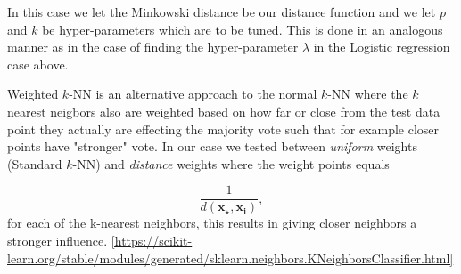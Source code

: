 \documentclass[../../project.tex]{subfiles}
\begin{document}
	In this case we let the Minkowski distance be our distance function and we let $p$ and $k$ be hyper-parameters which are to be tuned. This is done in an analogous manner as in the case of finding the hyper-parameter $\lambda$ in the Logistic regression case above. 
	
	Weighted $k$-NN is an alternative approach to the normal $k$-NN where the $k$ nearest neigbors also are weighted based on how far or close from the test data point they actually are effecting the majority vote such that for example closer points have "stronger" vote. In our case we tested between \textit{uniform} weights (Standard $k$-NN) and \textit{distance} weights where the weight points equals
	
	\begin{equation}
	\dfrac{1}{d(\boldsymbol{x_{\star}, \boldsymbol{x_i}})}, 
	\end{equation}
	for each of the k-nearest neighbors, this results in giving closer neighbors a stronger influence.
	\ref{https://scikit-learn.org/stable/modules/generated/sklearn.neighbors.KNeighborsClassifier.html}
\end{document}
